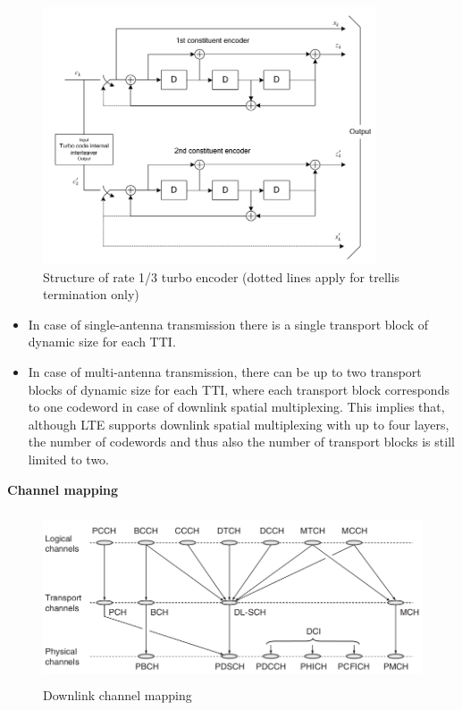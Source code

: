 \documentclass[titlepage]{article}
\numberwithin{figure}{section}
\numberwithin{equation}{section}
\begin{document}
\begin{figure}[htbp]
	\centering
	\includegraphics[height=3in]{turbo}
	\caption{Structure of rate 1/3 turbo encoder (dotted lines apply for trellis termination only)}
\end{figure}

\begin{itemize}
	\item In case of single-antenna transmission there is a single transport block of dynamic size for each TTI.

	\item In case of multi-antenna transmission, there can be up to two transport blocks of dynamic size for each TTI, where each transport block corresponds to one codeword in case of downlink spatial multiplexing. This implies that, although LTE supports downlink spatial multiplexing with up to four layers, the number of codewords and thus also the number of transport blocks is still limited to two.
\end{itemize}

\textbf{Channel mapping}

\begin{figure}[htbp]
	\centering
	\includegraphics[height=2in]{DLCH}
	\caption{Downlink channel mapping}
\end{figure}
\end{document}
